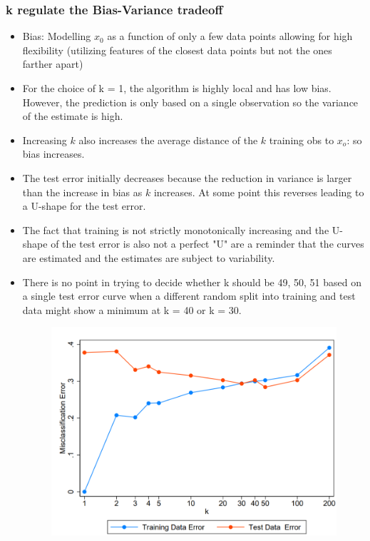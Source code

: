 \documentclass[12pt, oneside]{article}
\begin{document}
\subsubsection{k regulate  the Bias-Variance tradeoff}
\begin{itemize}
    \item Bias: Modelling $x_0$ as a function of only a few data points allowing for high flexibility (utilizing features of the closest data points but not the ones farther apart)
    \item For the choice of k = 1, the algorithm is highly local and has low bias. However, the prediction is only based on a single observation so the variance of the estimate is high.
    \item Increasing $k$ also increases the average distance of the $k$ training obs to $x_o$: so bias increases.
    \item The test error initially decreases because the reduction in variance is larger than the increase in bias as $k$ increases. At some point this reverses leading to a U-shape for the test error. 
    \item The fact that training is not strictly monotonically increasing and the U-shape of the test error is also not a perfect "U" are a reminder that the curves are estimated and the estimates are subject to variability.
    \item There is no point in trying to decide whether k should be 49, 50, 51 based on a single test error curve when a different random split into training and test data might show a minimum at k = 40 or k = 30.
    \begin{figure}[!ht]
    \centering
    \includegraphics[width=\textwidth]{knn-error.png}       
    \label{fig:my_label}
\end{figure}
\end{itemize}
\end{document}

